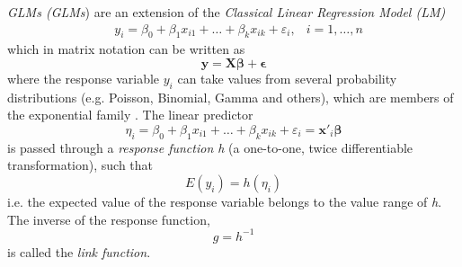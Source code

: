 \textit{\acl{GLM}s (\acs{GLM}s}) are an extension of the \textit{Classical Linear Regression Model (\acs{LM})}
$$
\begin{aligned}
&y_{i}=\beta_{0}+\beta_{1} x_{i 1}+\ldots+\beta_{k} x_{i k}+\varepsilon_{i}, &i=1, \ldots, n
\end{aligned}
$$
which in matrix notation can be written as
$$ \bm{y} = \bm{X}\bm{\beta} + \bm{\epsilon} $$
where the response variable $y_i$ can take values from several probability distributions (e.g. Poisson, Binomial, Gamma and others), which are members of the exponential family \cite{fahrmeir2003regression}. The linear predictor 
\begin{equation} 
\eta_i = \beta_{0}+\beta_{1} x_{i 1}+\ldots+\beta_{k} x_{i k}+\varepsilon_{i} = \bm{x'}_i \bm{\beta}
\label{eq:linear_predictor_glm}
\end{equation}
is passed through a \textit{response function h} (a one-to-one, twice differentiable transformation), such that
$$ E(y_i) = h(\eta_i)$$
i.e. the expected value of the response variable belongs to the value range of \textit{h}. The inverse of the response function, 
$$g = h^{-1}$$ is called the \textit{link function}.




